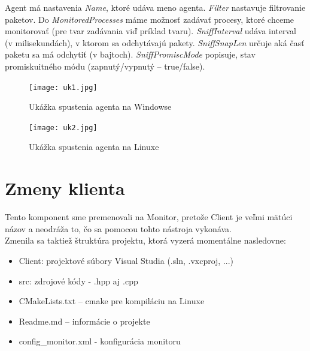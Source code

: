 \documentclass[a4paper,12pt]{article}
\begin{document}
Agent má nastavenia \textit{Name}, ktoré udáva meno agenta. \textit{Filter} nastavuje filtrovanie paketov. Do \textit{MonitoredProcesses} máme možnosť zadávať procesy, ktoré chceme monitorovať (pre tvar zadávania viď príklad tvaru). \textit{SniffInterval} udáva interval (v milisekundách), v ktorom sa odchytávajú pakety. \textit{SniffSnapLen} určuje aká časť paketu sa má odchytiť (v bajtoch). \textit{SniffPromiscMode} popisuje, stav promiskuitného módu (zapnutý/vypnutý – true/false). \\

\begin{figure}[h!]
	\centering
	\label{graf1}
	\texttt{[image: uk1.jpg]}
	\caption{Ukážka spustenia agenta na Windowse}
\end{figure}

\begin{figure}[h!]
	\centering
	\label{graf1}
	\texttt{[image: uk2.jpg]}
	\caption{Ukážka spustenia agenta na Linuxe}
\end{figure}
\newpage
\section{Zmeny klienta}

Tento komponent sme premenovali na Monitor, pretože Client je veľmi mätúci názov a neodráža to, čo sa pomocou tohto nástroja vykonáva. \\

\noindent Zmenila sa taktiež štruktúra projektu, ktorá vyzerá momentálne nasledovne:
\begin{itemize} 
	\item Client: projektové súbory Visual Studia (.sln, .vxcproj, ...) 
	\item src: zdrojové kódy - .hpp aj .cpp 
	\item CMakeLists.txt – cmake pre kompiláciu na Linuxe 
	\item Readme.md – informácie o projekte 
	\item config\_monitor.xml - konfigurácia monitoru\\
\end{itemize}
\end{document}
